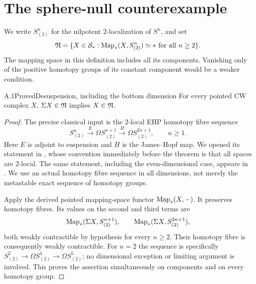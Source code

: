\section{The sphere-null counterexample}

We write $S^n_{(2)}$ for the nilpotent $2$-localization of $S^n$, and set
\[
 \mathfrak N=\{X\in\mathcal S_*:\operatorname{Map}_*(X,S^n_{(2)})\simeq *\text{ for all }n\geq2\}.
\]
The mapping space in this definition includes all its components. Vanishing only of the positive homotopy groups of its constant component would be a weaker condition.

\begin{claim}{A.1}{Proved}{Desuspension, including the bottom dimension}\label{A1}
For every pointed CW complex $X$, $\Sigma X\in\mathfrak N$ implies $X\in\mathfrak N$.
\end{claim}
\begin{proof}
The precise classical input is the $2$-local EHP homotopy fibre sequence
\[
 S^n_{(2)}\xrightarrow{E}\Omega S^{n+1}_{(2)}
       \xrightarrow{H}\Omega S^{2n+1}_{(2)},\qquad n\geq1.
\]
Here $E$ is adjoint to suspension and $H$ is the James--Hopf map. We opened its statement in \citet[Theorem 2.2]{Boyde2023}, whose convention immediately before the theorem is that all spaces are $2$-local. The same statement, including the even-dimensional case, appears in \citet[Theorem 1(ii), with $p=2$]{RavenelEHP2005}. We use an actual homotopy fibre sequence in all dimensions, not merely the metastable exact sequence of homotopy groups.

Apply the derived pointed mapping-space functor $\operatorname{Map}_*(X,-)$. It preserves homotopy fibres. Its values on the second and third terms are
\[
 \operatorname{Map}_*(\Sigma X,S^{n+1}_{(2)}),\qquad
 \operatorname{Map}_*(\Sigma X,S^{2n+1}_{(2)}),
\]
both weakly contractible by hypothesis for every $n\geq2$. Their homotopy fibre is consequently weakly contractible. For $n=2$ the sequence is specifically
$S^2_{(2)}\to\Omega S^3_{(2)}\to\Omega S^5_{(2)}$; no dimensional exception or limiting argument is involved. This proves the assertion simultaneously on components and on every homotopy group.
\end{proof}

